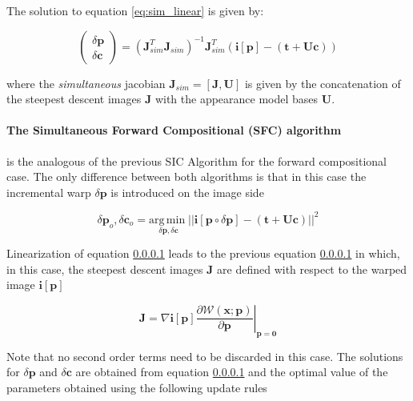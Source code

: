 The solution to equation \ref{eq:sim_linear} is given by:

\begin{equation}
\begin{pmatrix}
\delta \mathbf{p}
\\ 
\delta \mathbf{c}
\end{pmatrix} 
= 
\left( \mathbf{J}_{sim}^T \mathbf{J}_{sim} \right)^{-1} \mathbf{J}_{sim}^T \left( \mathbf{i}[\mathbf{p}] - (\mathbf{t} + \mathbf{U} \mathbf{c}) \right)
\end{equation}

where the \emph{simultaneous} jacobian $\mathbf{J}_{sim} = [\mathbf{J}, \mathbf{U}]$ is given by the concatenation of the steepest descent images $\mathbf{J}$ with the appearance model bases $\mathbf{U}$.


\paragraph{The Simultaneous Forward Compositional (SFC) algorithm} 

is the analogous of the previous SIC Algorithm for the forward compositional case. The only difference between both algorithms is that in this case the incremental warp $\delta \mathbf{p}$ is introduced on the image side

\begin{equation}
\delta \mathbf{p}_o, \delta \mathbf{c}_o = \underset{\delta \mathbf{p}, \delta \mathbf{c}}{\mathrm{arg\,min\;}} 
|| \mathbf{i} [\mathbf{p} \circ \delta \mathbf{p}] - \left( \mathbf{t} + \mathbf{U} \mathbf{c} \right) ||^2
\end{equation}

Linearization of equation \ref{} leads to the previous equation \ref{} in which, in this case, the steepest descent images $\mathbf{J}$ are defined with respect to the warped image $\mathbf{i}[\mathbf{p}]$

\begin{equation}
\mathbf{J} = 
\nabla \mathbf{i}[\mathbf{p}] \left. \frac{\partial \mathcal{W}(\mathbf{x}; \mathbf{p})}{\partial \mathbf{p}} \right|_{\mathbf{p}=\mathbf{0}}
\end{equation}

Note that no second order terms need to be discarded in this case. The solutions for $\delta \mathbf{p}$ and $\delta \mathbf{c}$ are obtained from equation \ref{} and the optimal value of the parameters obtained using the following update rules

